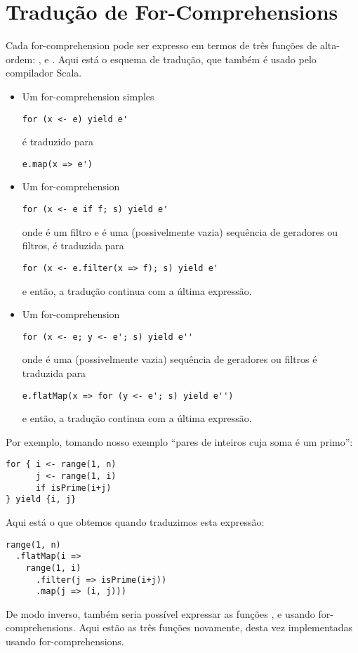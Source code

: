 \section{Tradução de For-Comprehensions}

Cada for-comprehension pode ser expresso em termos de três funções de alta-ordem: , 
 e . Aqui está o esquema de tradução, que também é usado pelo compilador Scala.
\begin{itemize}
\item
Um for-comprehension simples
\begin{lstlisting}
for (x <- e) yield e'
\end{lstlisting}
é traduzido para
\begin{lstlisting}
e.map(x => e')
\end{lstlisting}
\item
Um for-comprehension 
\begin{lstlisting}
for (x <- e if f; s) yield e'
\end{lstlisting}
onde  é um filtro e  é uma (possivelmente vazia) sequência de geradores ou filtros, 
é traduzida para 
\begin{lstlisting}
for (x <- e.filter(x => f); s) yield e'
\end{lstlisting}
e então, a tradução continua com a última expressão.
\item
Um for-comprehension 
\begin{lstlisting}
for (x <- e; y <- e'; s) yield e''
\end{lstlisting}
onde  é uma (possivelmente vazia) sequência de geradores ou filtros é traduzida para 
\begin{lstlisting}
e.flatMap(x => for (y <- e'; s) yield e'')
\end{lstlisting}
e então, a tradução continua com a última expressão.
\end{itemize}
Por exemplo, tomando nosso exemplo  ``pares de inteiros cuja soma é um primo'':
\begin{lstlisting}
for { i <- range(1, n)
      j <- range(1, i)
      if isPrime(i+j)
} yield {i, j}
\end{lstlisting}
Aqui está o que obtemos quando traduzimos esta expressão:
\begin{lstlisting}
range(1, n)
  .flatMap(i =>
    range(1, i)
      .filter(j => isPrime(i+j))
      .map(j => (i, j)))
\end{lstlisting}
De modo inverso, também seria possível expressar as funções ,  e 
usando for-comprehensions. Aqui estão as três funções novamente, desta vez implementadas usando
for-comprehensions.

